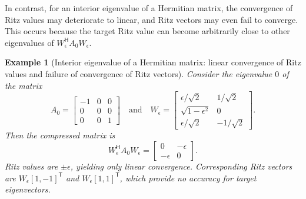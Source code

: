 \documentclass[a4paper,11pt]{article}
\newtheorem{example}{Example}
\newcommand{\Ttran}{\mathsf{T}}
\newcommand{\Htran}{\mathsf{H}}
\begin{document}
In contrast, for an interior eigenvalue of a Hermitian matrix, the convergence of Ritz values may deteriorate to linear, and Ritz vectors may even fail to converge. This occurs because the target Ritz value can become arbitrarily close to other eigenvalues of $W_{\epsilon}^{\Htran} A_{0} W_{\epsilon}$.
\begin{example}[Interior eigenvalue of a Hermitian matrix: linear convergence of Ritz values and failure of convergence of Ritz vectors]
    \label{eg:H}
    Consider the eigenvalue $0$ of the matrix  
    \begin{equation*}
        A_{0} = \begin{bmatrix}
            -1 & 0 & 0 \\ 
            0 & 0 & 0\\ 
            0 & 0 & 1
        \end{bmatrix}
        \quad\text{and}\quad 
        W_{\epsilon} = \begin{bmatrix}
            \epsilon/\sqrt{2} & 1/\sqrt{2}\\ 
            \sqrt{1-\epsilon^{2}} & 0 \\ 
            \epsilon/\sqrt{2} & -1/\sqrt{2}
        \end{bmatrix}.
    \end{equation*}
    Then the compressed matrix is 
    \begin{equation*}
        W_{\epsilon}^{\Htran}A_{0}W_{\epsilon} = \begin{bmatrix}
            0 & -\epsilon\\ 
            -\epsilon & 0
        \end{bmatrix}.
    \end{equation*}
    Ritz values are $\pm\epsilon$, yielding only linear convergence.
    Corresponding Ritz vectors are $W_{\epsilon}[1,-1]^{\Ttran}$ and $W_{\epsilon}[1,1]^{\Ttran}$, which provide no accuracy for target eigenvectors.
\end{example}
\end{document}

